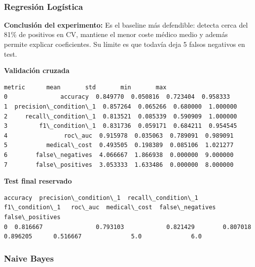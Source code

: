 \documentclass[11pt]{article}
\begin{document}
    
    \begin{center}
    \end{center}
    { \hspace*{\fill} \\}
    
    \subsubsection{Regresión Logística}\label{regresiuxf3n-loguxedstica}

    
    \textbf{Conclusión del experimento:} Es el baseline más defendible:
detecta cerca del 81\% de positivos en CV, mantiene el menor coste
médico medio y además permite explicar coeficientes. Su límite es que
todavía deja 5 falsos negativos en test.

    
    \textbf{Validación cruzada}

    
    
    \begin{Verbatim}[commandchars=\\\{\}]
                  metric      mean       std       min       max
0               accuracy  0.849770  0.050816  0.723404  0.958333
1  precision\_condition\_1  0.857264  0.065266  0.680000  1.000000
2     recall\_condition\_1  0.813521  0.085339  0.590909  1.000000
3         f1\_condition\_1  0.831736  0.059171  0.684211  0.954545
4                roc\_auc  0.915978  0.035063  0.789091  0.989091
5           medical\_cost  0.493505  0.198389  0.085106  1.021277
6        false\_negatives  4.066667  1.866938  0.000000  9.000000
7        false\_positives  3.053333  1.633486  0.000000  8.000000
    \end{Verbatim}

    
    \textbf{Test final reservado}

    
    
    \begin{Verbatim}[commandchars=\\\{\}]
   accuracy  precision\_condition\_1  recall\_condition\_1  f1\_condition\_1   roc\_auc  medical\_cost  false\_negatives  false\_positives
0  0.816667               0.793103            0.821429        0.807018  0.896205      0.516667              5.0              6.0
    \end{Verbatim}

    
    \subsubsection{Naive Bayes}\label{naive-bayes}
\end{document}
